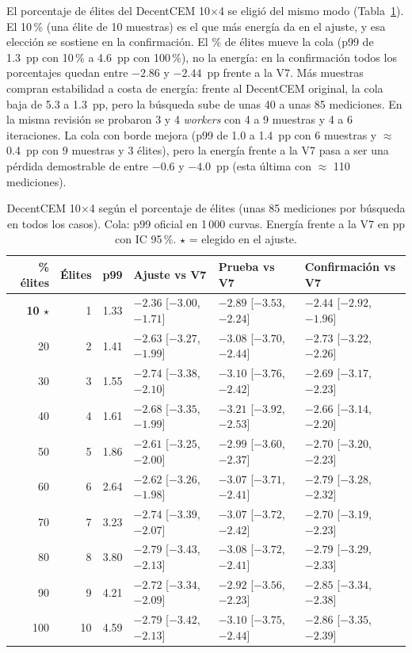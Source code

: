 \documentclass[letterpaper,11pt]{article}
\begin{document}
El porcentaje de élites del DecentCEM 10$\times$4 se eligió del mismo modo (Tabla~\ref{tab:elites}). El 10\,\% (una élite de 10 muestras) es el que más energía da en el ajuste, y esa elección se sostiene en la confirmación. El \% de élites mueve la cola (p99 de 1.3~pp con 10\,\% a 4.6~pp con 100\,\%), no la energía: en la confirmación todos los porcentajes quedan entre $-2.86$ y $-2.44$~pp frente a la V7. Más muestras compran estabilidad a costa de energía: frente al DecentCEM original, la cola baja de 5.3 a 1.3~pp, pero la búsqueda sube de unas 40 a unas 85 mediciones. En la misma revisión se probaron 3 y 4 \textit{workers} con 4 a 9 muestras y 4 a 6 iteraciones. La cola con borde mejora (p99 de 1.0 a 1.4~pp con 6 muestras y $\approx$ 0.4~pp con 9 muestras y 3 élites), pero la energía frente a la V7 pasa a ser una pérdida demostrable de entre $-0.6$ y $-4.0$~pp (esta última con $\approx$ 110 mediciones).

\begin{table}[H]
  \centering
  \caption{DecentCEM 10$\times$4 según el porcentaje de élites (unas 85 mediciones por búsqueda en todos los casos). Cola: p99 oficial en 1\,000 curvas. Energía frente a la V7 en pp con IC 95\,\%. $\star$ = elegido en el ajuste.}
  \label{tab:elites}
  \scriptsize
  \begin{tabular}{@{}rrrlll@{}}
    \toprule
    \textbf{\% élites} & \textbf{Élites} & \textbf{p99} & \textbf{Ajuste vs V7} & \textbf{Prueba vs V7} & \textbf{Confirmación vs V7} \\
    \midrule
    \textbf{10 $\star$} & 1 & 1.33 & $-2.36$ [$-3.00$, $-1.71$] & $-2.89$ [$-3.53$, $-2.24$] & $-2.44$ [$-2.92$, $-1.96$] \\
    20 & 2 & 1.41 & $-2.63$ [$-3.27$, $-1.99$] & $-3.08$ [$-3.70$, $-2.44$] & $-2.73$ [$-3.22$, $-2.26$] \\
    30 & 3 & 1.55 & $-2.74$ [$-3.38$, $-2.10$] & $-3.10$ [$-3.76$, $-2.42$] & $-2.69$ [$-3.17$, $-2.23$] \\
    40 & 4 & 1.61 & $-2.68$ [$-3.35$, $-1.99$] & $-3.21$ [$-3.92$, $-2.53$] & $-2.66$ [$-3.14$, $-2.20$] \\
    50 & 5 & 1.86 & $-2.61$ [$-3.25$, $-2.00$] & $-2.99$ [$-3.60$, $-2.37$] & $-2.70$ [$-3.20$, $-2.23$] \\
    60 & 6 & 2.64 & $-2.62$ [$-3.26$, $-1.98$] & $-3.07$ [$-3.71$, $-2.41$] & $-2.79$ [$-3.28$, $-2.32$] \\
    70 & 7 & 3.23 & $-2.74$ [$-3.39$, $-2.07$] & $-3.07$ [$-3.72$, $-2.42$] & $-2.70$ [$-3.19$, $-2.23$] \\
    80 & 8 & 3.80 & $-2.79$ [$-3.43$, $-2.13$] & $-3.08$ [$-3.72$, $-2.41$] & $-2.79$ [$-3.29$, $-2.33$] \\
    90 & 9 & 4.21 & $-2.72$ [$-3.34$, $-2.09$] & $-2.92$ [$-3.56$, $-2.23$] & $-2.85$ [$-3.34$, $-2.38$] \\
    100 & 10 & 4.59 & $-2.79$ [$-3.42$, $-2.13$] & $-3.10$ [$-3.75$, $-2.44$] & $-2.86$ [$-3.35$, $-2.39$] \\
    \bottomrule
  \end{tabular}
\end{table}
\end{document}
